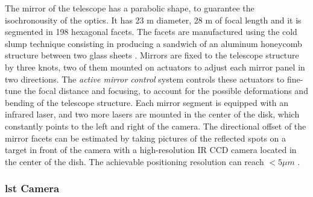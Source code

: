 \documentclass[main.tex]{subfiles}
\begin{document}
The mirror of the telescope has a parabolic shape, to guarantee the isochronousity of the optics. It has 23 m diameter, 28 m  of focal length and it is segmented in 198 hexagonal facets. The facets are manufactured using the cold slump technique consisting in producing a sandwich of an aluminum honeycomb structure between two glass sheets \cite{2017LST}.
Mirrors are fixed to the telescope structure by three knots, two of them mounted on actuators to adjust each mirror panel in two directions. The \textit{active mirror control} system controls these actuators to fine-tune the focal distance and focusing, to account for the possible deformations and bending of the telescope structure. Each mirror segment is equipped with an infrared laser, and two more lasers are mounted in the center of the disk, which constantly points to the left and right of the camera. The directional offset of the mirror facets can be estimated by taking pictures of the reflected spots on a target in front of the camera with a high-resolution IR CCD camera located in the center of the dish. The achievable positioning resolution can reach $< 5 \mu m$ \cite{2013LST}.

\subsubsection{\gls{lst} Camera}
\end{document}
